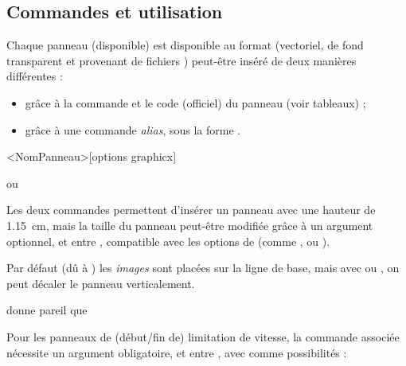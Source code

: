 \documentclass[french,11pt,a4paper]{article}
\begin{document}
\subsection{Commandes et utilisation}

Chaque panneau (disponible) est disponible au format  (vectoriel, de fond transparent et provenant de fichiers ) peut-être inséré de deux manières différentes :

\begin{itemize}
	\item grâce à la commande  et le code (officiel) du panneau (voir tableaux) ;
	\item grâce à une commande \textit{alias}, sous la forme .
\end{itemize}

\begin{codehigh}[language=latex/latex3,style/main=cyan!5,style/code=cyan!5]
\pr<NomPanneau>[options graphicx]
\end{codehigh}

\begin{demohigh}[language=latex/latex3,style/main=cyan!5,style/code=cyan!5,style/demo=cyan!5]
 ou \prChausRetG
\end{demohigh}

Les deux commandes permettent d'insérer un panneau avec une hauteur de 1.15~cm, mais la taille du panneau peut-être modifiée grâce à un argument optionnel, et entre \MontreCode{[...]}, compatible avec les options de  (comme ,  ou ).

\medskip

Par défaut (dû à ) les \textit{images} sont placées sur la ligne de base, mais avec  ou , on peut décaler le panneau verticalement.

\begin{demohigh}[language=latex/latex3,style/main=cyan!5,style/code=cyan!5,style/demo=cyan!5]
 donne pareil que \raisebox{-0.2\height}{\prInterdTournD[height=2ex]}
\end{demohigh}

\medskip

Pour les panneaux de (début/fin de) limitation de vitesse, la commande associée nécessite un argument obligatoire, et entre , avec comme possibilités  :
\end{document}
